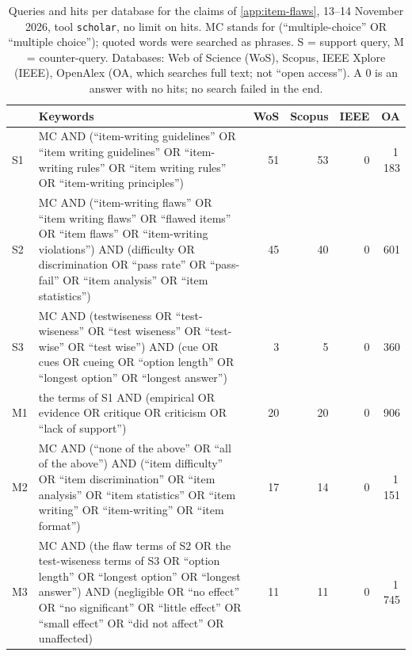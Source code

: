 \begin{table}[htbp]
  \caption{Queries and hits per database for the claims of
    \cref{app:item-flaws}, 13--14 November 2026, tool \texttt{scholar}, no
    limit on hits.  MC stands for (\enquote{multiple-choice} OR
    \enquote{multiple choice}); quoted words were searched as phrases.
    S = support query, M = counter-query.  Databases: Web of Science
    (WoS), Scopus, IEEE Xplore (IEEE), OpenAlex (OA, which searches full
    text; not \enquote{open access}).  A 0 is an answer with no hits; no
    search failed in the end.}
  \label{tab:sok-queries-item-flaws}
  \centering\footnotesize
  \begin{tabularx}{\linewidth}{@{}l>{\raggedright\arraybackslash}X
    rrrr@{}}
    \toprule
       & Keywords & WoS & Scopus & IEEE & OA \\
    \midrule
    S1 & MC AND (\enquote{item-writing guidelines} OR \enquote{item writing
         guidelines} OR \enquote{item-writing rules} OR \enquote{item
         writing rules} OR \enquote{item-writing principles})
       & 51 & 53 & 0 & 1\,183 \\
    S2 & MC AND (\enquote{item-writing flaws} OR \enquote{item writing
         flaws} OR \enquote{flawed items} OR \enquote{item flaws} OR
         \enquote{item-writing violations}) AND (difficulty OR
         discrimination OR \enquote{pass rate} OR \enquote{pass-fail} OR
         \enquote{item analysis} OR \enquote{item statistics})
       & 45 & 40 & 0 & 601 \\
    S3 & MC AND (testwiseness OR \enquote{test-wiseness} OR \enquote{test
         wiseness} OR \enquote{test-wise} OR \enquote{test wise}) AND (cue
         OR cues OR cueing OR \enquote{option length} OR \enquote{longest
         option} OR \enquote{longest answer})
       & 3 & 5 & 0 & 360 \\
    \midrule
    M1 & the terms of S1 AND (empirical OR evidence OR critique OR
         criticism OR \enquote{lack of support})
       & 20 & 20 & 0 & 906 \\
    M2 & MC AND (\enquote{none of the above} OR \enquote{all of the above})
         AND (\enquote{item difficulty} OR \enquote{item discrimination} OR
         \enquote{item analysis} OR \enquote{item statistics} OR
         \enquote{item writing} OR \enquote{item-writing} OR \enquote{item
         format})
       & 17 & 14 & 0 & 1\,151 \\
    M3 & MC AND (the flaw terms of S2 OR the test-wiseness terms of S3 OR
         \enquote{option length} OR \enquote{longest option} OR
         \enquote{longest answer}) AND (negligible OR \enquote{no effect}
         OR \enquote{no significant} OR \enquote{little effect} OR
         \enquote{small effect} OR \enquote{did not affect} OR unaffected)
       & 11 & 11 & 0 & 1\,745 \\
    \bottomrule
  \end{tabularx}
\end{table}


